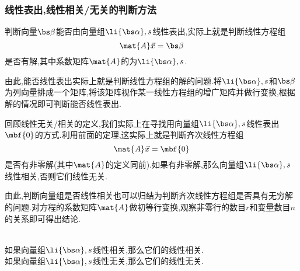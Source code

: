 \documentclass{ctexart}
\begin{document}
\subsubsection{线性表出,线性相关/无关的判断方法}
\begin{theorem}[线性表出的判别方法]
    判断向量$\bs\beta$能否由向量组$\li{\bs\alpha},s$线性表出,实际上就是判断线性方程组
    \[\mat{A}\vec{x}=\bs\beta\]
    是否有解,其中系数矩阵$\mat{A}$的为$\li{\bs\alpha},s$.
\end{theorem}
\begin{hint}
    由此,能否线性表出实际上就是判断线性方程组的解的问题.将$\li{\bs\alpha},s$和$\bs\beta$为列向量排成一个矩阵,将该矩阵视作某一线性方程组的增广矩阵并做行变换,根据解的情况即可判断能否线性表出.
\end{hint}
\begin{theorem}
    回顾线性无关/相关的定义,我们实际上在寻找用向量组$\li{\bs\alpha},s$线性表出$\mbf{0}$的方式.利用前面的定理,这实际上就是判断齐次线性方程组
    \[\mat{A}\vec{x}=\mbf{0}\]
    是否有非零解(其中$\mat{A}$的定义同前).如果有非零解,那么向量组$\li{\bs\alpha},s$线性相关,否则它们线性无关.
\end{theorem}
\begin{hint}
    由此,判断向量组是否线性相关也可以归结为判断齐次线性方程组是否具有无穷解的问题.对方程的系数矩阵$\mat{A}$做初等行变换,观察非零行的数目$r$和变量数目$n$的关系即可得出结论.
\end{hint}
\begin{theorem}\\
    如果向量组$\li{\bs\alpha},s$线性相关,那么它们的线性相关.\\
    如果向量组$\li{\bs\alpha},s$线性无关,那么它们的线性无关. 
\end{theorem}
\end{document}
